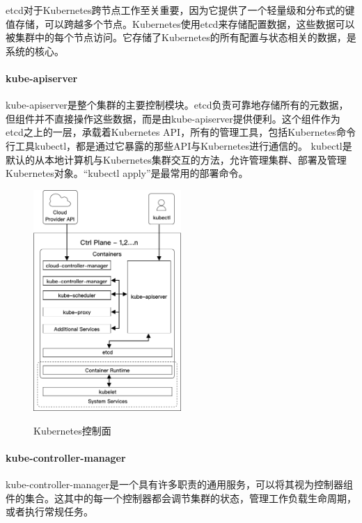 \documentclass[macfonts,master]{njuthesis}
\begin{document}
etcd对于Kubernetes跨节点工作至关重要，因为它提供了一个轻量级和分布式的键值存储，可以跨越多个节点。Kubernetes使用etcd来存储配置数据，这些数据可以被集群中的每个节点访问。它存储了Kubernetes的所有配置与状态相关的数据，是系统的核心。

\paragraph{kube-apiserver}
kube-apiserver是整个集群的主要控制模块。etcd负责可靠地存储所有的元数据，但组件并不直接操作这些数据，而是由kube-apiserver提供便利。这个组件作为etcd之上的一层，承载着Kubernetes API，所有的管理工具，包括Kubernetes命令行工具kubectl，都是通过它暴露的那些API与Kubernetes进行通信的。 kubectl是默认的从本地计算机与Kubernetes集群交互的方法，允许管理集群、部署及管理Kubernetes对象。``kubectl apply''是最常用的部署命令。


\begin{figure}[htbp]
  \centering
  \includegraphics[width= 0.5\textwidth]{pics/K8s-ctrl-plane.png}\\
  \caption{Kubernetes控制面\cite{gorillaguide}}\label{fig:k8s-ctrl}
\end{figure}


\paragraph{kube-controller-manager}
kube-controller-manager是一个具有许多职责的通用服务，可以将其视为控制器组件的集合。这其中的每一个控制器都会调节集群的状态，管理工作负载生命周期，或者执行常规任务\cite{gorillaguide}。
\end{document}
